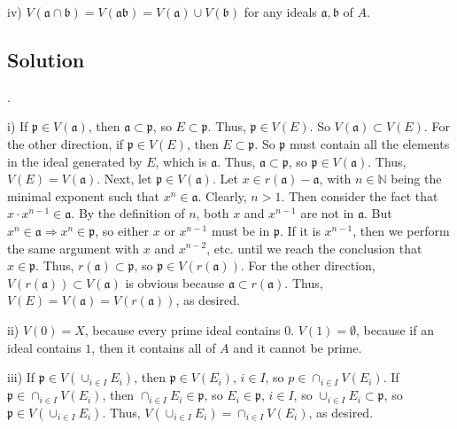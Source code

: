 \documentclass[book,12pt,oneside,openany]{memoir}
\begin{document}
iv) $V(\mathfrak{a} \cap \mathfrak{b}) = V(\mathfrak{a}\mathfrak{b}) = V(\mathfrak{a}) \cup V(\mathfrak{b})$ for any ideals $\mathfrak{a}, \mathfrak{b}$ of $A$.

\subsection{Solution}
.

i) If $\mathfrak{p} \in V(\mathfrak{a})$, then $\mathfrak{a} \subset \mathfrak{p}$, so $E \subset \mathfrak{p}$. Thus, $\mathfrak{p} \in V(E)$. So $V(\mathfrak{a}) \subset V(E)$. For the other direction, if $\mathfrak{p} \in V(E)$, then $E \subset \mathfrak{p}$. So $\mathfrak{p}$ must contain all the elements in the ideal generated by $E$, which is $\mathfrak{a}$. Thus, $\mathfrak{a} \subset \mathfrak{p}$, so $\mathfrak{p} \in V(\mathfrak{a})$. Thus, $V(E) = V(\mathfrak{a})$. Next, let $\mathfrak{p} \in V(\mathfrak{a})$. Let $x \in r(\mathfrak{a}) - \mathfrak{a}$, with $n \in \mathbb{N}$ being the minimal exponent such that $x^n \in \mathfrak{a}$. Clearly, $n > 1$. Then consider the fact that $x \cdot x^{n-1} \in \mathfrak{a}$. By the definition of $n$, both $x$ and $x^{n-1}$ are not in $\mathfrak{a}$. But $x^{n} \in \mathfrak{a} \Rightarrow x^n \in \mathfrak{p}$, so either $x$ or $x^{n-1}$ must be in $\mathfrak{p}$. If it is $x^{n-1}$, then we perform the same argument with $x$ and $x^{n-2}$, etc. until we reach the conclusion that $x \in \mathfrak{p}$. Thus, $r(\mathfrak{a}) \subset \mathfrak{p}$, so $\mathfrak{p} \in V(r(\mathfrak{a}))$. For the other direction, $V(r(\mathfrak{a})) \subset V(\mathfrak{a})$ is obvious because $\mathfrak{a} \subset r(\mathfrak{a})$. Thus, $V(E) = V(\mathfrak{a}) = V(r(\mathfrak{a}))$, as desired.

ii) $V(0) = X$, because every prime ideal contains $0$. $V(1) = \emptyset$, because if an ideal contains $1$, then it contains all of $A$ and it cannot be prime.

iii) If $\mathfrak{p} \in V(\cup_{i \in I} E_i)$, then $\mathfrak{p} \in V(E_i)$, $i \in I$, so $p \in \cap_{i \in I} V(E_i)$. If $\mathfrak{p} \in \cap_{i \in I} V(E_i)$, then $\cap_{i \in I} E_i \in \mathfrak{p}$, so $E_i \in \mathfrak{p}$, $i \in I$, so $\cup_{i \in I} E_i \subset \mathfrak{p}$, so $\mathfrak{p} \in V(\cup_{i \in I} E_i)$. Thus, $V (\cup_{i \in I} E_i ) = \cap_{i \in I} V(E_i)$, as desired.
\end{document}
